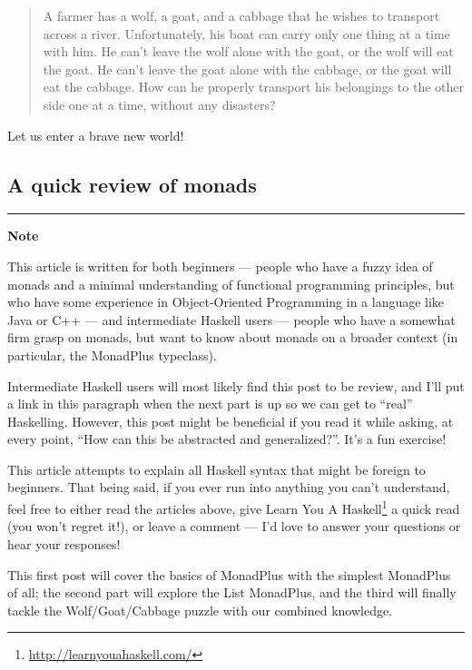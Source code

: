 \documentclass[]{article}
\renewcommand{\href}[2]{#2\footnote{\url{#1}}}
\begin{document}
\begin{quote}
A farmer has a wolf, a goat, and a cabbage that he wishes to transport across a
river. Unfortunately, his boat can carry only one thing at a time with him. He
can't leave the wolf alone with the goat, or the wolf will eat the goat. He
can't leave the goat alone with the cabbage, or the goat will eat the cabbage.
How can he properly transport his belongings to the other side one at a time,
without any disasters?
\end{quote}

Let us enter a brave new world!

\subsection{A quick review of monads}\label{a-quick-review-of-monads}

\begin{center}\rule{0.5\linewidth}{0.5pt}\end{center}

\textbf{Note}

This article is written for both beginners --- people who have a fuzzy idea of
monads and a minimal understanding of functional programming principles, but who
have some experience in Object-Oriented Programming in a language like Java or
C++ --- and intermediate Haskell users --- people who have a somewhat firm grasp
on monads, but want to know about monads on a broader context (in particular,
the MonadPlus typeclass).

Intermediate Haskell users will most likely find this post to be review, and
I'll put a link in this paragraph when the next part is up so we can get to
``real'' Haskelling. However, this post might be beneficial if you read it while
asking, at every point, ``How can this be abstracted and generalized?''. It's a
fun exercise!

This article attempts to explain all Haskell syntax that might be foreign to
beginners. That being said, if you ever run into anything you can't understand,
feel free to either read the articles above, give
\href{http://learnyouahaskell.com/}{Learn You A Haskell} a quick read (you won't
regret it!), or leave a comment --- I'd love to answer your questions or hear
your responses!

This first post will cover the basics of MonadPlus with the simplest MonadPlus
of all; the second part will explore the List MonadPlus, and the third will
finally tackle the Wolf/Goat/Cabbage puzzle with our combined knowledge.
\end{document}
